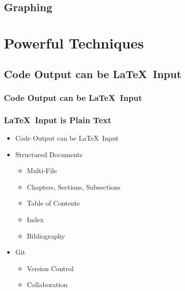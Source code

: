 \documentclass{beamer}
\begin{document}
\begin{frame}[t, fragile]
	\frametitle{}
\Large
\hfil
\lstset{style=mystyle}

\end{frame}


\subsection{Graphing}


\section{Powerful Techniques}
\subsection{Code Output can be \LaTeX \ Input}

\begin{frame}[t]
	\frametitle{Code Output can be \LaTeX \ Input}
\Large
\lstset{style=mystyle}

\end{frame}

\begin{frame}[t]
	\frametitle{}
\Large
\lstset{style=mystyle}

\end{frame}

\begin{frame}[t]
	\frametitle{}
\Large
\lstset{style=mystyle}


\end{frame}

\begin{frame}[t]
	\frametitle{\LaTeX \ Input is Plain Text}
\Large
\begin{itemize}
	\item Code Output can be \LaTeX \ Input
	\item Structured Documents
	\begin{itemize}
		\item Multi-File
		\item Chapters, Sections, Subsections
		\item Table of Contents
		\item Index
		\item Bibliography
	\end{itemize}
	\item Git
	\begin{itemize}
		\item Version Control
		\item Collaboration
	\end{itemize}
\end{itemize}


\end{frame}
\end{document}
